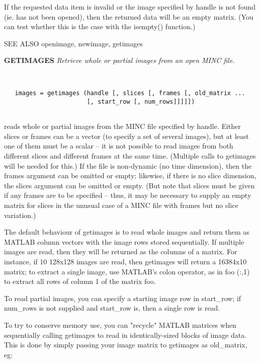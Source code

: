   If the requested data item is invalid or the image specified by handle
  is not found (ie. has not been opened), then the returned data will
  be an empty matrix.  (You can test whether this is the case with
  the isempty() function.)
 
  SEE ALSO  openimage, newimage, getimages
\endfunchelp

{\large\bf GETIMAGES} {\em  Retrieve whole or partial images from an open MINC file.}
\begin{verbatim}


   images = getimages (handle [, slices [, frames [, old_matrix ...
                       [, start_row [, num_rows]]]]])


\end{verbatim}

   reads whole or partial images from the MINC file specified by
   handle.  Either slices or frames can be a vector (to specify a
   set of several images), but at least one of them must be a scalar
   -- it is not possible to read images from both different slices and
   different frames at the same time.  (Multiple calls to getimages
   will be needed for this.)  If the file is non-dynamic (no time
   dimension), then the frames argument can be omitted or empty;
   likewise, if there is no slice dimension, the slices argument can
   be omitted or empty.  (But note that slices must be given if any
   frames are to be specified -- thus, it may be necessary to supply
   an empty matrix for slices in the unusual case of a MINC file with
   frames but no slice variation.)
 
   The default behaviour of getimages is to read whole images and
   return them as MATLAB column vectors with the image rows stored
   sequentially.  If multiple images are read, then they will be
   returned as the columns of a matrix.  For instance, if 10 128x128
   images are read, then getimages will return a 16384x10 matrix; to
   extract a single image, use MATLAB's colon operator, as in foo
   (:,1) to extract all rows of column 1 of the matrix foo.
 
   To read partial images, you can specify a starting image row in
   start\_row; if num\_rows is not supplied and start\_row is, then a
   single row is read.  
 
   To try to conserve memory use, you can "recycle" MATLAB matrices
   when sequentially calling getimages to read in identically-sized
   blocks of image data.  This is done by simply passing your image
   matrix to getimages as old\_matrix, eg:
 
